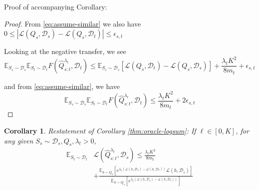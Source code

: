 \documentclass{article}
\theoremstyle{plain}
\newtheorem{corollary}[theorem]{Corollary}
\theoremstyle{definition}
\theoremstyle{remark}
\begin{document}
Proof of accompanying Corollary:
\begin{proof}
From \eqref{eq:assume-similar} we also have $0\leq |\mathcal{L}(Q_s,\mathcal{D}_s)-\mathcal{L}(Q_s,\mathcal{D}_t)|
\leq \epsilon_{s,t}$

Looking at the negative transfer, we see
\begin{equation*}
\mathbb{E}_{S_s\sim \mathcal{D}_s}\mathbb{E}_{S_t\sim \mathcal{D}_t}F(\hat{Q}^{\lambda_t}_{s:t},\mathcal{D}_t)\leq \mathbb{E}_{S_s\sim \mathcal{D}_s}\left [\mathcal{L}(Q_{s},\mathcal{D}_t)-\mathcal{L}(Q_{s},\mathcal{D}_s)\right ]+\frac{\lambda_t K^2}{8m_t} + \epsilon_{s,t}
\end{equation*}

and from \eqref{eq:assume-similar}, we have
\begin{equation*}
\mathbb{E}_{S_s\sim \mathcal{D}_s}\mathbb{E}_{S_t\sim \mathcal{D}_t}F(\hat{Q}^{\lambda_t}_{s:t},\mathcal{D}_t)\leq \frac{\lambda_t K^2}{8m_t} + 2\epsilon_{s,t}
\end{equation*}

\end{proof}


\begin{corollary} Restatement of Corollary \ref{thm:oracle-logsum}:
If $\ell\in[0,K]$, for any given $S_s\sim \mathcal{D}_s, Q_s, \lambda_t>0$, 
%
\begin{equation} 
\begin{split}
\mathbb{E}_{S_t\sim \mathcal{D}_t}&\mathcal{L}( \hat{Q}^{\lambda_t}_{s:t},\mathcal{D}_s)\leq \frac{\lambda_t K^2}{8m_t}\\&+\frac{\mathbb{E}_{h\sim Q_s}\left [e^{\lambda_t(\mathcal{L}(h,\mathcal{D}_s)-\mathcal{L}(h,\mathcal{D}_t))}\mathcal{L}(h,\mathcal{D}_s) \right ]}{\mathbb{E}_{h\sim Q_s}\left [e^{\lambda_t(\mathcal{L}(h,\mathcal{D}_s)-\mathcal{L}(h,\mathcal{D}_t))}\right ]}
\end{split}
\end{equation}
\end{corollary}
\end{document}
